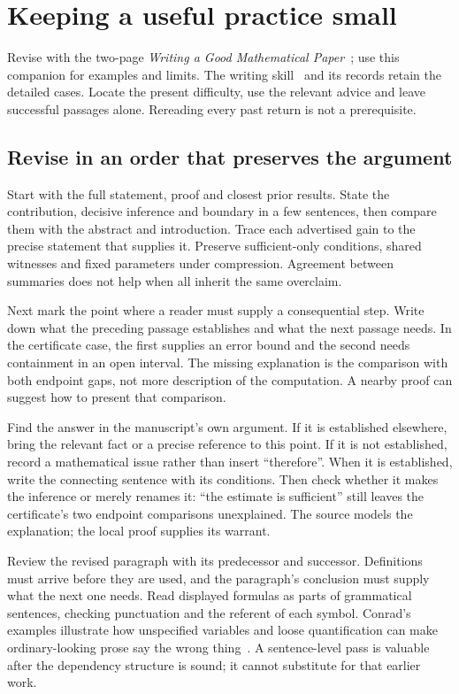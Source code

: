 \section{Keeping a useful practice small}\label{sec:practice}

Revise with the two-page \emph{Writing a Good Mathematical Paper}~\cite{compact};
use this companion for examples and limits. The writing skill~\cite{skill}
and its records retain the detailed cases. Locate the present difficulty,
use the relevant advice and leave successful passages alone. Rereading every
past return is not a prerequisite.

\subsection{Revise in an order that preserves the argument}\label{sec:revision-order}

Start with the full statement, proof and closest prior results. State the
contribution, decisive inference and boundary in a few sentences, then compare
them with the abstract and introduction. Trace each advertised gain to the
precise statement that supplies it. Preserve sufficient-only conditions, shared
witnesses and fixed parameters under compression. Agreement between summaries
does not help when all inherit the same overclaim.

Next mark the point where a reader must supply a consequential step. Write
down what the preceding passage establishes and what the next passage needs.
In the certificate case, the first supplies an error bound and the second
needs containment in an open interval. The missing explanation is the comparison
with both endpoint gaps, not more description of the computation. A nearby
proof can suggest how to present that comparison.

Find the answer in the manuscript's own argument. If it is established elsewhere,
bring the relevant fact or a precise reference to this point. If it is not
established, record a mathematical issue rather than insert ``therefore''.
When it is established, write the connecting sentence with its conditions.
Then check whether it makes the inference or merely renames it: ``the estimate
is sufficient'' still leaves the certificate's two endpoint comparisons unexplained.
The source models the explanation; the local proof supplies its warrant.

Review the revised paragraph with its predecessor and successor. Definitions
must arrive before they are used, and the paragraph's conclusion must supply
what the next one needs. Read displayed formulas as parts of grammatical
sentences, checking punctuation and the referent of each symbol. Conrad's
examples illustrate how unspecified variables and loose quantification can
make ordinary-looking prose say the wrong thing~\cite[\S\S1--2]{conrad}.
A sentence-level pass is valuable after the dependency structure is sound;
it cannot substitute for that earlier work.

